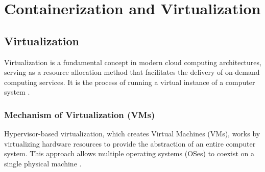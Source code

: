 \section{Containerization and Virtualization}
\subsection{Virtualization}
Virtualization is a fundamental concept in modern cloud computing architectures, serving as a resource allocation method that facilitates the delivery of on-demand computing services. It is the process of running a virtual instance of a computer system \cite{Comparison_of_Containerization_and_Virtualization_in_Cloud_Architectures}.

\subsubsection{Mechanism of Virtualization (VMs)}
Hypervisor-based virtualization, which creates Virtual Machines (VMs), works by virtualizing hardware resources to provide the abstraction of an entire computer system. This approach allows multiple operating systems (OSes) to coexist on a single physical machine \cite{Containers_or_Hypervisors_Which_is_Better_for_Database_Consolidation}.

